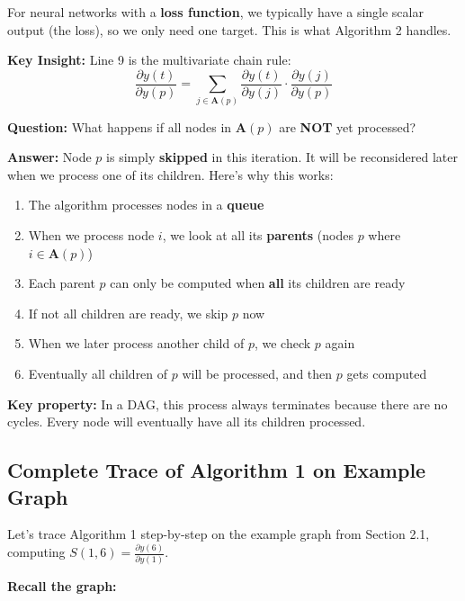 \begin{notechapter}
\begin{tcolorbox}[colback=green!5,colframe=green!60,title=Extension to Multiple Output Nodes]
For neural networks with a \textbf{loss function}, we typically have a single scalar output (the loss), so we only need one target. This is what Algorithm 2 handles.
\end{tcolorbox}

\textbf{Key Insight:} Line 9 is the multivariate chain rule:
$$\frac{\partial y(t)}{\partial y(p)} = \sum_{j \in \mathbf{A}(p)} \frac{\partial y(t)}{\partial y(j)} \cdot \frac{\partial y(j)}{\partial y(p)}$$

\begin{tcolorbox}[colback=yellow!5,colframe=orange!80,title=Understanding the IF Condition (Line 8)]
\textbf{Question:} What happens if all nodes in $\mathbf{A}(p)$ are \textbf{NOT} yet processed?

\textbf{Answer:} Node $p$ is simply \textbf{skipped} in this iteration. It will be reconsidered later when we process one of its children. Here's why this works:

\begin{enumerate}
    \item The algorithm processes nodes in a \textbf{queue}
    \item When we process node $i$, we look at all its \textbf{parents} (nodes $p$ where $i \in \mathbf{A}(p)$)
    \item Each parent $p$ can only be computed when \textbf{all} its children are ready
    \item If not all children are ready, we skip $p$ now
    \item When we later process another child of $p$, we check $p$ again
    \item Eventually all children of $p$ will be processed, and then $p$ gets computed
\end{enumerate}

\textbf{Key property:} In a DAG, this process always terminates because there are no cycles. Every node will eventually have all its children processed.
\end{tcolorbox}

\subsection{Complete Trace of Algorithm 1 on Example Graph}

Let's trace Algorithm 1 step-by-step on the example graph from Section 2.1, computing $S(1,6) = \frac{\partial y(6)}{\partial y(1)}$.

\textbf{Recall the graph:}
\begin{center}
\end{center}
\end{notechapter}
